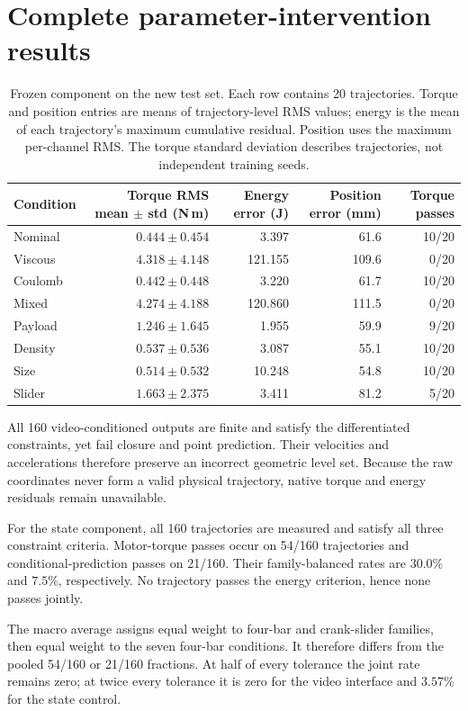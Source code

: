 \section{Complete parameter-intervention results}
\label{app:allresults}
\begin{table}[t]
\caption{Frozen \stater{} component on the new test set. Each row contains 20 trajectories. Torque and position entries are means of trajectory-level RMS values; energy is the mean of each trajectory's maximum cumulative residual. Position uses the maximum per-channel RMS. The torque standard deviation describes trajectories, not independent training seeds.}
\centering
\small
\begin{tabular}{lrrrr}
\toprule
Condition & Torque RMS mean $\pm$ std (N\,m) & Energy error (J) & Position error (mm) & Torque passes\\
\midrule
Nominal & $0.444\!\pm\!0.454$ & 3.397 & 61.6 & 10/20 \\
Viscous & $4.318\!\pm\!4.148$ & 121.155 & 109.6 & 0/20 \\
Coulomb & $0.442\!\pm\!0.448$ & 3.220 & 61.7 & 10/20 \\
Mixed & $4.274\!\pm\!4.188$ & 120.860 & 111.5 & 0/20 \\
Payload & $1.246\!\pm\!1.645$ & 1.955 & 59.9 & 9/20 \\
Density & $0.537\!\pm\!0.536$ & 3.087 & 55.1 & 10/20 \\
Size & $0.514\!\pm\!0.532$ & 10.248 & 54.8 & 10/20 \\
Slider & $1.663\!\pm\!2.375$ & 3.411 & 81.2 & 5/20 \\
\bottomrule
\end{tabular}
\end{table}

All 160 video-conditioned outputs are finite and satisfy the differentiated constraints, yet fail closure and point prediction. Their velocities and accelerations therefore preserve an incorrect geometric level set. Because the raw coordinates never form a valid physical trajectory, native torque and energy residuals remain unavailable.

For the state component, all 160 trajectories are measured and satisfy all three constraint criteria. Motor-torque passes occur on 54/160 trajectories and conditional-prediction passes on 21/160. Their family-balanced rates are $30.0\%$ and $7.5\%$, respectively. No trajectory passes the energy criterion, hence none passes jointly.

The macro average assigns equal weight to four-bar and crank-slider families, then equal weight to the seven four-bar conditions. It therefore differs from the pooled 54/160 or 21/160 fractions. At half of every tolerance the joint rate remains zero; at twice every tolerance it is zero for the video interface and $3.57\%$ for the state control.

